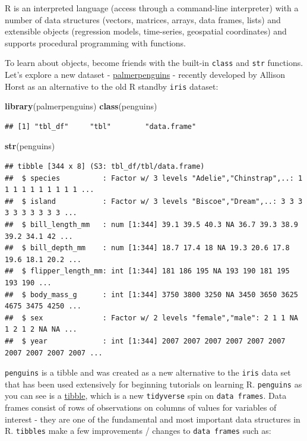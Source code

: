 \documentclass[
]{book}
\newenvironment{Shaded}{\begin{snugshade}}{\end{snugshade}}
\newcommand{\KeywordTok}[1]{\textcolor[rgb]{0.13,0.29,0.53}{\textbf{#1}}}
\newcommand{\NormalTok}[1]{#1}
\begin{document}
R is an interpreted language (access through a command-line interpreter) with a number of data structures (vectors, matrices, arrays, data frames, lists) and extensible objects (regression models, time-series, geospatial coordinates) and supports procedural programming with functions.

To learn about objects, become friends with the built-in \texttt{class} and \texttt{str} functions. Let's explore a new dataset - \href{https://github.com/allisonhorst/palmerpenguins}{palmerpenguins} - recently developed by Allison Horst as an alternative to the old R standby \texttt{iris} dataset:

\begin{Shaded}
\begin{Highlighting}[]
\KeywordTok{library}\NormalTok{(palmerpenguins)}
\KeywordTok{class}\NormalTok{(penguins)}
\end{Highlighting}
\end{Shaded}

\begin{verbatim}
## [1] "tbl_df"     "tbl"        "data.frame"
\end{verbatim}

\begin{Shaded}
\begin{Highlighting}[]
\KeywordTok{str}\NormalTok{(penguins)}
\end{Highlighting}
\end{Shaded}

\begin{verbatim}
## tibble [344 x 8] (S3: tbl_df/tbl/data.frame)
##  $ species          : Factor w/ 3 levels "Adelie","Chinstrap",..: 1 1 1 1 1 1 1 1 1 1 ...
##  $ island           : Factor w/ 3 levels "Biscoe","Dream",..: 3 3 3 3 3 3 3 3 3 3 ...
##  $ bill_length_mm   : num [1:344] 39.1 39.5 40.3 NA 36.7 39.3 38.9 39.2 34.1 42 ...
##  $ bill_depth_mm    : num [1:344] 18.7 17.4 18 NA 19.3 20.6 17.8 19.6 18.1 20.2 ...
##  $ flipper_length_mm: int [1:344] 181 186 195 NA 193 190 181 195 193 190 ...
##  $ body_mass_g      : int [1:344] 3750 3800 3250 NA 3450 3650 3625 4675 3475 4250 ...
##  $ sex              : Factor w/ 2 levels "female","male": 2 1 1 NA 1 2 1 2 NA NA ...
##  $ year             : int [1:344] 2007 2007 2007 2007 2007 2007 2007 2007 2007 2007 ...
\end{verbatim}

\texttt{penguins} is a tibble and was created as a new alternative to the \texttt{iris} data set that has been used extensively for beginning tutorials on learning R. \texttt{penguins} as you can see is a \href{https://tibble.tidyverse.org/}{tibble}, which is a new \texttt{tidyverse} spin on \texttt{data\ frames}. Data frames consist of rows of observations on columns of values for variables of interest - they are one of the fundamental and most important data structures in R. \texttt{tibbles} make a few improvements / changes to \texttt{data\ frames} such as:
\end{document}
